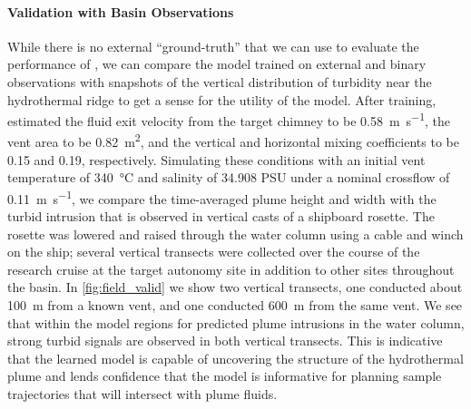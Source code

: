 \paragraph{\PHUMES Validation with Basin Observations}
While there is no external ``ground-truth'' that we can use to evaluate the performance of \PHORTEX, we can compare the \PHUMES model trained on external and binary \Sentry observations with snapshots of the vertical distribution of turbidity near the hydrothermal ridge to get a sense for the utility of the \PHUMES model. After training, \PHUMES estimated the fluid exit velocity from the target chimney to be \SI{0.58}{\meter\per\second}, the vent area to be \SI{0.82}{\meter\squared}, and the vertical and horizontal mixing coefficients to be 0.15 and 0.19, respectively. Simulating these conditions with an initial vent temperature of \SI{340}{\celsius} and salinity of 34.908 PSU under a nominal crossflow of \SI{0.11}{\meter\per\second}, we compare the time-averaged plume height and width with the turbid intrusion that is observed in vertical casts of a shipboard rosette. The rosette was lowered and raised through the water column using a cable and winch on the ship; several vertical transects were collected over the course of the research cruise at the target autonomy site in addition to other sites throughout the basin. In \cref{fig:field_valid} we show two vertical transects, one conducted about \SI{100}{\meter} from a known vent, and one conducted \SI{600}{\meter} from the same vent. We see that within the model regions for predicted plume intrusions in the water column, strong turbid signals are observed in both vertical transects. This is indicative that the learned \PHUMES model is capable of uncovering the structure of the hydrothermal plume and lends confidence that the model is informative for planning sample trajectories that will intersect with plume fluids.

